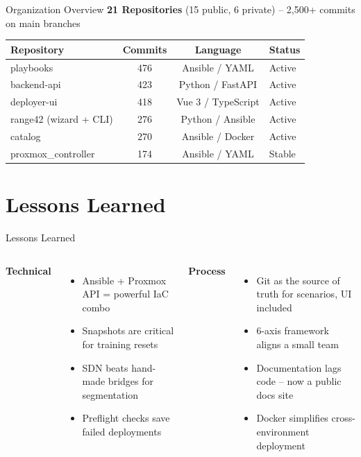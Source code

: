 \documentclass[aspectratio=169]{beamer}
\begin{document}
\begin{frame}{Organization Overview \; \faClipboardCheck}
  \textbf{21 Repositories} (15 public, 6 private) -- \alert{2{,}500+ commits} on main branches\\[3mm]

  \begin{table}
    \footnotesize\color{cyber-ink}
    \begin{tabular}{l|ccl}
      \textbf{Repository} & \textbf{Commits} & \textbf{Language} & \textbf{Status} \\
      \hline
      playbooks & 476 & Ansible / YAML & Active \\
      backend-api & 423 & Python / FastAPI & Active \\
      deployer-ui & 418 & Vue 3 / TypeScript & Active \\
      range42 (wizard + CLI) & 276 & Python / Ansible & Active \\
      catalog & 270 & Ansible / Docker & Active \\
      proxmox\_controller & 174 & Ansible / YAML & Stable \\
    \end{tabular}
  \end{table}
\end{frame}

\section{Lessons Learned}

\begin{frame}{Lessons Learned \; \faLightbulb}
  \begin{columns}[T]
    \textbf{Technical}
    \begin{itemize}
      \item \alert{Ansible + Proxmox API} = powerful IaC combo
      \item Snapshots are critical for training resets
      \item \alert{SDN beats hand-made bridges} for segmentation
      \item Preflight checks save failed deployments
    \end{itemize}

    \textbf{Process}
    \begin{itemize}
      \item \alert{Git as the source of truth} for scenarios, UI included
      \item 6-axis framework aligns a small team
      \item Documentation lags code -- now a public docs site
      \item Docker simplifies cross-environment deployment
    \end{itemize}
  \end{columns}
\end{frame}
\end{document}
